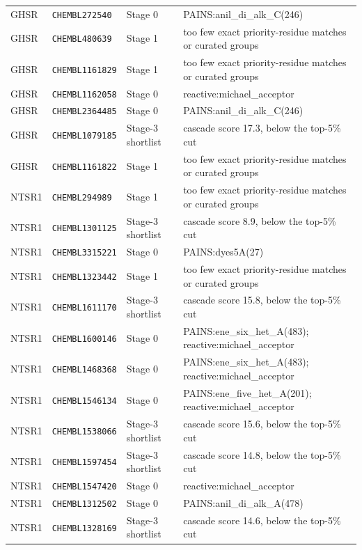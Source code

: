 {\begin{longtable}{@{}llp{}p{}@{}}
GHSR & \texttt{CHEMBL272540} & Stage 0 & PAINS:anil\_di\_alk\_C(246) \\
GHSR & \texttt{CHEMBL480639} & Stage 1 & too few exact priority-residue matches or curated groups \\
GHSR & \texttt{CHEMBL1161829} & Stage 1 & too few exact priority-residue matches or curated groups \\
GHSR & \texttt{CHEMBL1162058} & Stage 0 & reactive:michael\_acceptor \\
GHSR & \texttt{CHEMBL2364485} & Stage 0 & PAINS:anil\_di\_alk\_C(246) \\
GHSR & \texttt{CHEMBL1079185} & Stage-3 shortlist & cascade score 17.3, below the top-5\% cut \\
GHSR & \texttt{CHEMBL1161822} & Stage 1 & too few exact priority-residue matches or curated groups \\
NTSR1 & \texttt{CHEMBL294989} & Stage 1 & too few exact priority-residue matches or curated groups \\
NTSR1 & \texttt{CHEMBL1301125} & Stage-3 shortlist & cascade score 8.9, below the top-5\% cut \\
NTSR1 & \texttt{CHEMBL3315221} & Stage 0 & PAINS:dyes5A(27) \\
NTSR1 & \texttt{CHEMBL1323442} & Stage 1 & too few exact priority-residue matches or curated groups \\
NTSR1 & \texttt{CHEMBL1611170} & Stage-3 shortlist & cascade score 15.8, below the top-5\% cut \\
NTSR1 & \texttt{CHEMBL1600146} & Stage 0 & PAINS:ene\_six\_het\_A(483); reactive:michael\_acceptor \\
NTSR1 & \texttt{CHEMBL1468368} & Stage 0 & PAINS:ene\_six\_het\_A(483); reactive:michael\_acceptor \\
NTSR1 & \texttt{CHEMBL1546134} & Stage 0 & PAINS:ene\_five\_het\_A(201); reactive:michael\_acceptor \\
NTSR1 & \texttt{CHEMBL1538066} & Stage-3 shortlist & cascade score 15.6, below the top-5\% cut \\
NTSR1 & \texttt{CHEMBL1597454} & Stage-3 shortlist & cascade score 14.8, below the top-5\% cut \\
NTSR1 & \texttt{CHEMBL1547420} & Stage 0 & reactive:michael\_acceptor \\
NTSR1 & \texttt{CHEMBL1312502} & Stage 0 & PAINS:anil\_di\_alk\_A(478) \\
NTSR1 & \texttt{CHEMBL1328169} & Stage-3 shortlist & cascade score 14.6, below the top-5\% cut \\

\end{longtable}}
